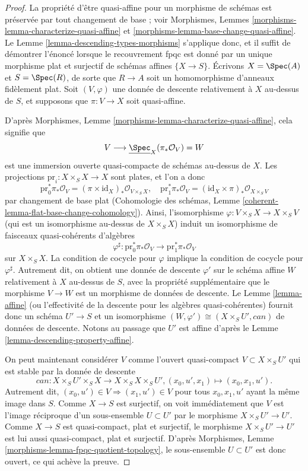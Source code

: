 \begin{proof}
La propriété d'être quasi-affine pour un morphisme de schémas est préservée
par tout changement de base ; voir Morphismes,
Lemmes \ref{morphisms-lemma-characterize-quasi-affine} et
\ref{morphisms-lemma-base-change-quasi-affine}. Le
Lemme \ref{lemma-descending-types-morphisms} s'applique donc, et il suffit de
démontrer l'énoncé lorsque le recouvrement fpqc est donné par un unique
morphisme plat et surjectif de schémas affines $\{X \to S\}$. Écrivons
$X = \Spec(A)$ et $S = \Spec(R)$, de sorte que $R \to A$ soit un
homomorphisme d'anneaux fidèlement plat. Soit $(V, \varphi)$ une donnée de
descente relativement à $X$ au-dessus de $S$, et supposons que
$\pi : V \to X$ soit quasi-affine.

\medskip\noindent
D'après Morphismes,
Lemme \ref{morphisms-lemma-characterize-quasi-affine}, cela signifie que
$$
V \longrightarrow \underline{\Spec}_X(\pi_*\mathcal{O}_V) = W
$$
est une immersion ouverte quasi-compacte de schémas au-dessus de $X$. Les
projections $\text{pr}_i : X \times_S X \to X$ sont plates, et l'on a donc
$$
\text{pr}_0^*\pi_*\mathcal{O}_V =
(\pi \times \text{id}_X)_*\mathcal{O}_{V \times_S X}, \quad
\text{pr}_1^*\pi_*\mathcal{O}_V =
(\text{id}_X \times \pi)_*\mathcal{O}_{X \times_S V}
$$
par changement de base plat (Cohomologie des schémas,
Lemme \ref{coherent-lemma-flat-base-change-cohomology}). Ainsi,
l'isomorphisme $\varphi : V \times_S X \to X \times_S V$ (qui est un
isomorphisme au-dessus de $X \times_S X$) induit un isomorphisme de faisceaux
quasi-cohérents d'algèbres
$$
\varphi^\sharp :
\text{pr}_0^*\pi_*\mathcal{O}_V
\longrightarrow
\text{pr}_1^*\pi_*\mathcal{O}_V
$$
sur $X \times_S X$. La condition de cocycle pour $\varphi$ implique la
condition de cocycle pour $\varphi^\sharp$. Autrement dit, on obtient une
donnée de descente $\varphi'$ sur le schéma affine $W$ relativement à $X$
au-dessus de $S$, avec la propriété supplémentaire que le morphisme $V \to W$
est un morphisme de données de descente. Le Lemme \ref{lemma-affine} (ou
l'effectivité de la descente pour les algèbres quasi-cohérentes) fournit donc
un schéma $U' \to S$ et un isomorphisme
$(W, \varphi') \cong (X \times_S U', can)$ de données de descente. Notons au
passage que $U'$ est affine d'après le
Lemme \ref{lemma-descending-property-affine}.

\medskip\noindent
On peut maintenant considérer $V$ comme l'ouvert quasi-compact
$V \subset X \times_S U'$ qui est stable par la donnée de descente
$$
can : X \times_S U' \times_S X \to X \times_S X \times_S U',
(x_0, u', x_1) \mapsto (x_0, x_1, u').
$$
Autrement dit, $(x_0, u') \in V \Rightarrow (x_1, u') \in V$ pour tous
$x_0, x_1, u'$ ayant la même image dans $S$. Comme $X \to S$ est surjectif,
on voit immédiatement que $V$ est l'image réciproque d'un sous-ensemble
$U \subset U'$ par le morphisme $X \times_S U' \to U'$. Comme $X \to S$ est
quasi-compact, plat et surjectif, le morphisme $X \times_S U' \to U'$ est lui
aussi quasi-compact, plat et surjectif. D'après Morphismes,
Lemme \ref{morphisms-lemma-fpqc-quotient-topology}, le sous-ensemble
$U \subset U'$ est donc ouvert, ce qui achève la preuve.
\end{proof}
